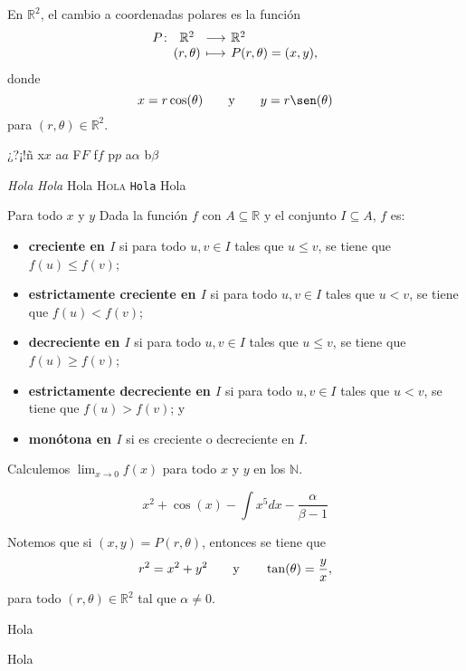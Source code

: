 \documentclass[a4]{aleph-notas-test}
\begin{document}
\encabezado

\begin{defi}
    En $\mathbb{R}^2$, el cambio a coordenadas polares es la función
    \[
        \funcion{P}{\mathbb{R}^2}{\mathbb{R}^2}
        {(r,\theta)}{P(r , \theta)=(x,y),}
    \]
    donde
    \[
        x= r\cos(\theta)
        \texty
        y= r\sen(\theta)
    \]
    para $(r,\theta)\in \mathbb{R}^2$.
\end{defi}

¿?¡!ñ x$x$ a$a$ F$F$ f$f$ p$p$ a$\alpha$ b$\beta$

\textit{Hola} \textsl{Hola} Hola \textsc{Hola} \texttt{Hola} \textsf{Hola}

Para todo $x$ y $y$ Dada la función $f$ con $A\subseteq \mathbb{R}$ y el conjunto $I\subseteq A$, $f$ es:
    \begin{itemize}
    \item
       \textbf{creciente en $I$} si para todo $u,v\in I$ tales que $u\leq v$, se tiene que $f(u)\leq f(v)$;
    \item
        \textbf{estrictamente creciente en $I$} si para todo $u,v\in I$ tales que $u< v$, se tiene que $f(u)< f(v)$;
    \item
        \textbf{decreciente en $I$} si para todo $u,v\in I$ tales que $u\leq v$, se tiene que $f(u)\geq f(v)$;
    \item
        \textbf{estrictamente decreciente en $I$} si para todo $u,v\in I$ tales que $u< v$, se tiene que $f(u)> f(v)$; y
    \item
        \textbf{monótona en $I$} si es creciente o decreciente en $I$.
    \end{itemize}

Calculemos $\displaystyle\lim_{x\to 0}f(x)$ para todo $x$ y $y$ en los $\mathbb{N}$.

\[
    x^2 + \cos(x) - \int x^5 dx - \frac{\alpha}{\beta-1}
\]

\begin{advertencia}
    Notemos que si $(x,y)=P(r,\theta)$, entonces se tiene que
    \[
        r^2=x^2+y^2
        \qquad\text{y}\qquad
        \tan(\theta)=\frac y x,
    \]  
    para todo $(r,\theta)\in\mathbb{R}^2$ tal que $\alpha\neq 0$.
\end{advertencia}

\begin{teo}
    Hola
\end{teo}

\begin{teo}
    Hola
\end{teo}
\end{document}
